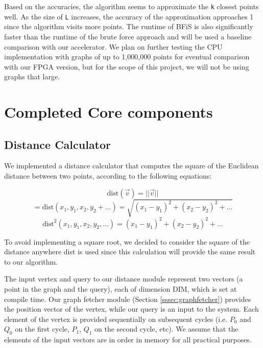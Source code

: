 \documentclass[conference]{IEEEtran}
\begin{document}
Based on the accuracies, the algorithm seems to approximate the \texttt{k} closest points well. As the size of \texttt{L} increases, the accuracy of the approximation approaches 1 since the algorithm visits more points. The runtime of BFiS is also significantly faster than the runtime of the brute force approach and will be used a baseline comparison with our accelerator. We plan on further testing the CPU implementation with graphs of up to 1,000,000 points for eventual comparison with our FPGA version, but for the scope of this project, we will not be using graphs that large.


\section{Completed Core components}

\subsection{Distance Calculator}

We implemented a distance calculator that computes the square of the Euclidean distance between two points, according to the following equations:

$$\text{dist}(\vec v) = ||\vec v||$$
$$=\text{dist}(x_1,y_1,x_2,y_2+\dots)=\sqrt{(x_1-y_1)^2+(x_2-y_2)^2+\dots}$$
$$\text{dist}^2(x_1,y_1,x_2,y_2,\dots)=(x_1-y_1)^2+(x_2-y_2)^2+\dots$$


To avoid implementing a square root, we decided to consider the square of the distance anywhere dist is used since this calculation will provide the same result to our algorithm.


The input vertex and query to our distance module represent two vectors (a point in the graph and the query), each of dimension DIM, which is set at compile time. Our graph fetcher module (Section \ref{sssec:graphfetcher}) provides the position vector of the vertex, while our query is an input to the system. Each element of the vertex is provided sequentially on subsequent cycles (i.e. $P_0$ and $Q_0$ on the first cycle, $P_1$, $Q_1$ on the second cycle, etc). We assume that the elements of the input vectors are in order in memory for all practical purposes. 
\end{document}

